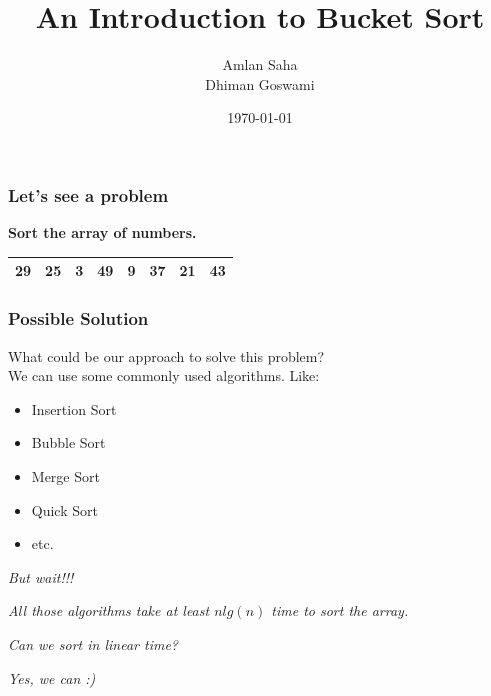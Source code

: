 \documentclass[pdf]{beamer}
\title{An Introduction to Bucket Sort}
\author{Amlan Saha\\Dhiman Goswami}
\institute{Bangladesh University of Engineering and Technology\\Dhaka, Bangladesh}
\date{\today}
\begin{document}
\begin{frame}
\titlepage
\end{frame}

\begin{frame}
	\frametitle{Let's see a problem}
		\pause
		\textbf{Sort the array of numbers.}
		\pause
		\begin{table}[h]
			\centering
			\begin{tabular}{|c|c|c|c|c|c|c|c|}
				\hline
				29 & 25 & 3 & 49 & 9 & 37 & 21 & 43\\
				\hline
			\end{tabular}
		\end{table}
\end{frame}

\begin{frame}
	\frametitle{Possible Solution}
	What could be our approach to solve this problem?\\
	\pause
	We can use some commonly used algorithms. Like:
	\pause
	\begin{itemize}
		\item Insertion Sort
		\pause
		\item Bubble Sort
		\pause
		\item Merge Sort
		\pause
		\item Quick Sort
		\pause
		\item etc.
	\end{itemize}
\end{frame}

\begin{frame}
	\begin{block}{
		\color{red}
		\textit{But wait!!!}}
	\end{block}
	\pause
	\begin{block}{
		\color{red}
		\textit{All those algorithms take at least $n lg(n)$ time to sort the array.}}
	\end{block}
	\pause
	\begin{block}{
		\color{blue}
		\textit{Can we sort in linear time?}}
	\end{block}

	\pause
	\begin{block}{
		\color{olivegreen}\textit{Yes, we can :)}}
	\end{block}	
\end{frame}
\end{document}
